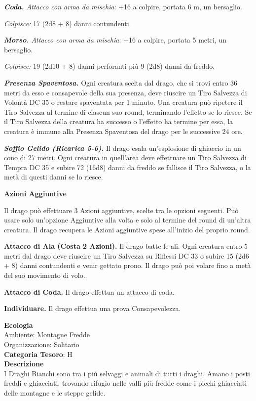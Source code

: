 \begin{multicols}{2}
{\emph{\textbf{Coda.} Attacco con arma da mischia}: +16 a colpire, portata 6 m, un bersaglio.

\emph{Colpisce:} 17 (2d8 + 8) danni contundenti.

\emph{\textbf{Morso.} Attacco con arma da mischia}: +16 a colpire, portata 5 metri, un bersaglio.

\emph{Colpisce:} 19 (2d10 + 8) danni perforanti più 9 (2d8) danni da freddo.

\emph{\textbf{Presenza Spaventosa.}} Ogni creatura scelta dal drago, che si trovi entro 36 metri da esso e consapevole della sua presenza, deve riuscire un Tiro Salvezza di Volontà DC 35 o restare spaventata per 1 minuto. Una creatura può ripetere il Tiro Salvezza al termine di ciascun suo round, terminando l'effetto se lo riesce. Se il Tiro Salvezza della creatura ha successo o l'effetto ha termine per essa, la creatura è immune alla Presenza Spaventosa del drago per le successive 24 ore.

\emph{\textbf{Soffio Gelido (Ricarica 5-6).}} Il drago esala un'esplosione di ghiaccio in un cono di 27 metri. Ogni creatura in quell'area deve effettuare un Tiro Salvezza di Tempra DC 35 e subire 72 (16d8) danni da freddo se fallisce il Tiro Salvezza, o la metà di questi danni se lo riesce.

\textbf{Azioni Aggiuntive}

Il drago può effettuare 3 Azioni aggiuntive, scelte tra le opzioni seguenti. Può usare solo un'opzione Aggiuntive alla volta e solo al termine del round di un'altra creatura. Il drago recupera le Azioni aggiuntive spese all'inizio del proprio round.

\textbf{Attacco di Ala (Costa 2 Azioni).} Il drago batte le ali. Ogni creatura entro 5 metri dal drago deve riuscire un Tiro Salvezza su Riflessi DC 33 o subire 15 (2d6 + 8) danni contundenti e venir gettato prono. Il drago può poi volare fino a metà del suo movimento di volo.

\textbf{Attacco di Coda.} Il drago effettua un attacco di coda.

\textbf{Individuare.} Il drago effettua una prova Consapevolezza.

\textbf{Ecologia}\\
Ambiente: Montagne Fredde\\
Organizzazione: Solitario\\
\textbf{Categoria Tesoro}: H\\
\textbf{Descrizione}\\
I Draghi Bianchi sono tra i più selvaggi e animali di tutti i draghi.
Amano i posti freddi e ghiacciati, trovando rifugio nelle valli più fredde come i picchi ghiacciati delle montagne e le steppe gelide.

}
\end{multicols}
